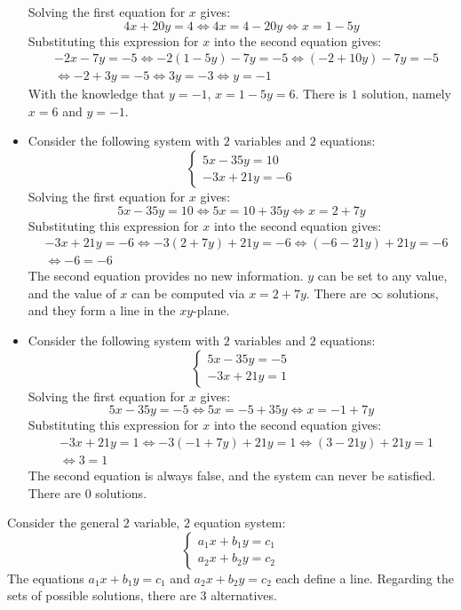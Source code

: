 \documentclass{article}
\begin{document}
\begin{itemize}
Solving the first equation for \(x\) gives:
\[4x + 20y = 4 \iff 4x = 4 - 20y \iff x = 1 - 5y\]
Substituting this expression for \(x\) into the second equation gives:
\begin{align*}
& -2x - 7y = -5 \iff -2(1 - 5y) - 7y = -5 \iff (-2 + 10y) - 7y = -5 \\
& \iff -2 + 3y = -5 \iff 3y = -3 \iff y = -1
\end{align*}
With the knowledge that \(y = -1\), \(x = 1 - 5y = 6\). There is \(1\) solution, namely \(x = 6\) and \(y = -1\).
\item Consider the following system with \(2\) variables and \(2\) equations:  
\[\left\{\begin{array}{c} 5x - 35y = 10 \\ -3x + 21y = -6 \end{array}\right.\]
Solving the first equation for \(x\) gives:
\[5x - 35y = 10 \iff 5x = 10 + 35y \iff x = 2 + 7y\]
Substituting this expression for \(x\) into the second equation gives:
\begin{align*}
& -3x + 21y = -6 \iff -3(2 + 7y) + 21y = -6 \iff (-6 - 21y) + 21y = -6 \\
& \iff -6 = -6  
\end{align*}
The second equation provides no new information. \(y\) can be set to any value, and the value of \(x\) can be computed via \(x = 2 + 7y\). There are \(\infty\) solutions, and they form a line in the \(xy\)-plane.
\item Consider the following system with \(2\) variables and \(2\) equations:  
\[\left\{\begin{array}{c} 5x - 35y = -5 \\ -3x + 21y = 1 \end{array}\right.\]
Solving the first equation for \(x\) gives:
\[5x - 35y = -5 \iff 5x = -5 + 35y \iff x = -1 + 7y\]
Substituting this expression for \(x\) into the second equation gives:
\begin{align*}
& -3x + 21y = 1 \iff -3(-1 + 7y) + 21y = 1 \iff (3 - 21y) + 21y = 1 \\
& \iff 3 = 1  
\end{align*}
The second equation is always false, and the system can never be satisfied. There are \(0\) solutions.
\end{itemize}

Consider the general \(2\) variable, \(2\) equation system:
\[\left\{\begin{array}{c}
a_1 x + b_1 y = c_1 \\
a_2 x + b_2 y = c_2
\end{array}\right.\]
The equations \(a_1 x + b_1 y = c_1\) and \(a_2 x + b_2 y = c_2\) each define a line. Regarding the sets of possible solutions, there are \(3\) alternatives.
\end{document}
